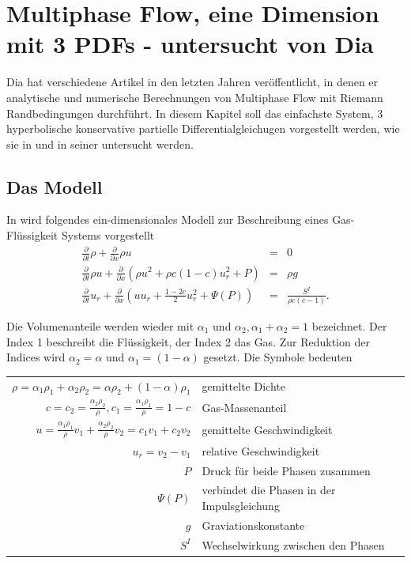 \section{Multiphase Flow, eine Dimension mit 3 PDFs - untersucht von Dia} \label{sec:1d_simple}

Dia hat verschiedene Artikel in den letzten Jahren veröffentlicht, in
denen er analytische und numerische Berechnungen von Multiphase Flow
mit Riemann Randbedingungen durchführt. In diesem Kapitel soll das
einfachste System, 3 hyperbolische konservative partielle
Differentialgleichugen vorgestellt werden, wie sie in \cite{dia_2009}
und in seiner \cite{dia_diss} untersucht werden.
  
\subsection{Das Modell} \label{sec:3pdfs_1d}

In \cite{dia_2009} wird folgendes ein-dimensionales Modell zur Beschreibung
eines Gas-Flüssigkeit Systems vorgestellt
\begin{eqnarray}
\frac{\partial}{\partial t}\rho + \frac{\partial}{\partial x} \rho u
&=&  0\label{eq:dia_2009_k}\\
\frac{\partial}{\partial t} \rho u + \frac{\partial}{\partial x} (
\rho u^2 + \rho c (1-c) u_r^2 + P)&=& \rho g \label{eq:dia_2009_i}\\
\frac{\partial}{\partial t} u_r + \frac{\partial}{\partial x} (
uu_r + \frac{1-2c}{2} u_r^2 + \Psi(P)) &=& \frac{S^I}{\rho c
  (c-1)}. \label{eq:dia_2009_r}
\end{eqnarray}


Die Volumenanteile werden wieder mit $ \alpha_1$ und $\alpha_2,
\alpha_1+\alpha_2=1$ bezeichnet. Der Index 1 beschreibt die
Flüssigkeit, der Index 2 das Gas. Zur Reduktion der Indices wird
$\alpha_2=\alpha$ und $\alpha_1=(1-\alpha)$ gesetzt. Die Symbole
bedeuten

\begin{tabular}{rl}
$\rho = \alpha_1\rho_1 + \alpha_2\rho_ 2 = \alpha \rho_2 + (1-\alpha)
  \rho_1$ & gemittelte Dichte\\[3mm]
$c = c_2 = \frac{\alpha_2\rho_2}{\rho}, c_1 =
  \frac{\alpha_1\rho_1}{\rho} = 1-c$ & Gas-Massenanteil\\[3mm]
$u = \frac{\alpha_1\rho_1}{\rho} v_1 + \frac{\alpha_2\rho_2}{\rho} v_2  
   = c_1 v_1 + c_2 v_2$  & gemittelte Geschwindigkeit\\[3mm]
$u_r = v_2 - v_1$ & relative Geschwindigkeit\\[3mm]
$P$ & Druck für beide Phasen zusammen\\[3mm]
$\Psi(P)$ & verbindet die Phasen in der Impulsgleichung\\[3mm]
$g$ & Graviationskonstante\\[3mm]
$S^I$& Wechselwirkung zwischen den Phasen\\[3mm]
\end{tabular}

